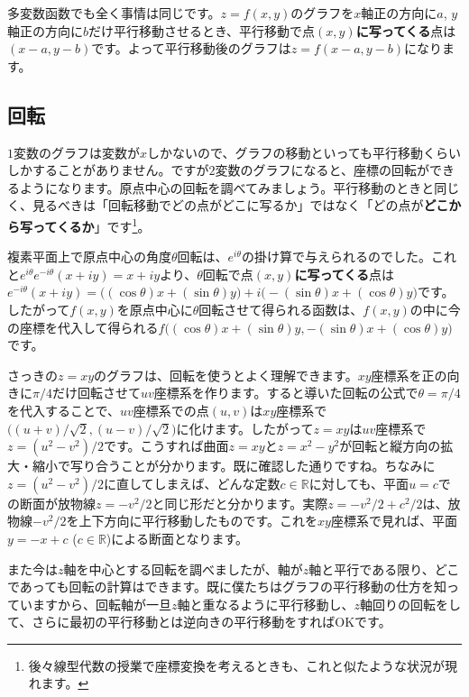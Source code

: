 多変数函数でも全く事情は同じです。$z=f(x,y)$のグラフを$x$軸正の方向に$a$, $y$軸正の方向に$b$だけ平行移動させるとき、平行移動で点$(x, y)$\textbf{に写ってくる}点は$(x-a, y-b)$です。よって平行移動後のグラフは$z=f(x-a,y-b)$になります。

\subsection{回転}

$1$変数のグラフは変数が$x$しかないので、グラフの移動といっても平行移動くらいしかすることがありません。ですが$2$変数のグラフになると、座標の回転ができるようになります。原点中心の回転を調べてみましょう。平行移動のときと同じく、見るべきは「回転移動でどの点がどこに写るか」ではなく「どの点が\textbf{どこから写ってくるか}」です\footnote{後々線型代数の授業で座標変換を考えるときも、これと似たような状況が現れます。}。

複素平面上で原点中心の角度$\theta$回転は、$e^{i\theta}$の掛け算で与えられるのでした。これと$e^{i\theta}e^{-i\theta}(x+iy)=x+iy$より、$\theta$回転で点$(x,y)$\textbf{に写ってくる}点は$e^{-i\theta}(x+iy) = \bigl((\cos\theta) x + (\sin\theta)y \bigr) + i\bigl(-(\sin\theta) x + (\cos\theta) y\bigr)$です。したがって$f(x,y)$を原点中心に$\theta$回転させて得られる函数は、$f(x,y)$の中に今の座標を代入して得られる$f\bigl((\cos\theta) x + (\sin\theta)y, -(\sin\theta) x + (\cos\theta) y\bigr)$です。


さっきの$z = xy$のグラフは、回転を使うとよく理解できます。$xy$座標系を正の向きに$\pi/4$だけ回転させて$uv$座標系を作ります。すると導いた回転の公式で$\theta=\pi/4$を代入することで、$uv$座標系での点$(u,v)$は$xy$座標系で$\bigl((u+v)/\sqrt{2},(u-v)/\sqrt{2}\bigr)$に化けます。したがって$z = xy$は$uv$座標系で$z = (u^2-v^2)/2$です。こうすれば曲面$z = xy$と$z = x^2-y^2$が回転と縦方向の拡大・縮小で写り合うことが分かります。既に確認した通りですね。ちなみに$z = (u^2-v^2)/2$に直してしまえば、どんな定数$c\in\mathbb{R}$に対しても、平面$u = c$での断面が放物線$z = -v^2 /2$と同じ形だと分かります。実際$z = -v^2/2 + c^2/2$は、放物線$-v^2/2$を上下方向に平行移動したものです。これを$xy$座標系で見れば、平面$y = -x + c$ ($c\in\mathbb{R}$)による断面となります。

また今は$z$軸を中心とする回転を調べましたが、軸が$z$軸と平行である限り、どこであっても回転の計算はできます。既に僕たちはグラフの平行移動の仕方を知っていますから、回転軸が一旦$z$軸と重なるように平行移動し、$z$軸回りの回転をして、さらに最初の平行移動とは逆向きの平行移動をすればOKです。

